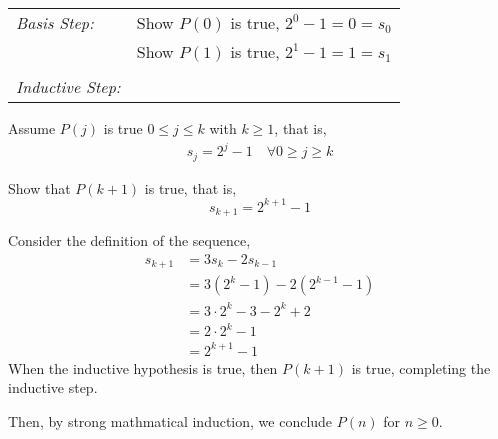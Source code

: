 \documentclass[10pt,addpoints]{exam}
\begin{document}
\begin{questions}
\begin{solution}
	\smallskip
	\begin{tabular}{lp{4in}}
	  \textit{Basis Step:} 	& Show $P(0)$ is true, $2^0 - 1 = 0 = s_0$ \\
	  						& Show $P(1)$ is true, $2^1 - 1 = 1 = s_1$ \\
	   & \\
	 \textit{Inductive Step:} &  \\
	\end{tabular}

	Assume $P(j)$ is true $0 \leq j \leq k$ with $k \geq 1$, that is, 
	\begin{align*}
		s_j = 2^j - 1 \quad \forall 0 \geq j \geq k \tag{IH}
	\end{align*}

	Show that $P(k+1)$ is true, that is,
	\[ s_{k+1} = 2^{k+1} - 1 \] 

	Consider the definition of the sequence, 
	\begin{align*}
		s_{k+1} &= 3s_{k} - 2s_{k-1} \\
		&= 3(2^k - 1) - 2(2^{k-1} - 1) \\
		&= 3\cdot 2^k - 3 - 2^k + 2 \\
		&= 2\cdot 2^k - 1 \\
		&= 2^{k+1} - 1
	\end{align*}
	When the inductive hypothesis is true, then $P(k+1)$ is true, completing the inductive step. 

	Then, by strong mathmatical induction, we conclude $P(n)$ for $n \geq 0$.
\end{solution}




\end{questions}
\end{document}
